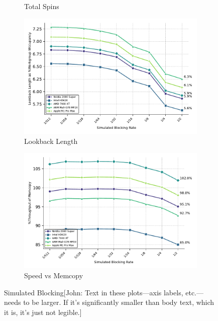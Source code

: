 \documentclass[sigconf]{acmart}
\newcommand{\john}[1]{{\footnotesize\color{cyan}[John: #1]}}
\begin{document}
\begin{figure}
\begin{subfigure}{.9\linewidth}
    \caption{Total Spins}
    \label{fig:total_spins}
  \end{subfigure}
  \begin{subfigure}{.9\linewidth}
    \centering
    \includegraphics[width=\linewidth]{graphics/lookbackLength_plot.pdf}
    \caption{Lookback Length}
    \label{fig:lookback_length}
  \end{subfigure}
  \begin{subfigure}{.9\linewidth}
    \centering
    \includegraphics[width=\linewidth]{graphics/time_plot.pdf}
    \caption{Speed vs Memcopy}
    \label{fig:execution_time}
  \end{subfigure}
  \caption{Simulated Blocking\john{Text in these plots---axis labels, etc.---needs to be larger. If it's significantly smaller than body text, which it is, it's just not legible.}}
  \label{fig:vertical_images}
\end{figure}
\end{document}
